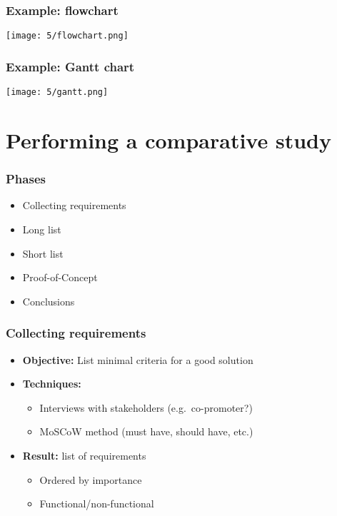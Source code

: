 \documentclass[aspectratio=169]{beamer}
\begin{document}
\begin{frame}
  \frametitle{Example: flowchart}

  \centering
  \texttt{[image: 5/flowchart.png]}
\end{frame}

\begin{frame}
  \frametitle{Example: Gantt chart}

  \centering
  \texttt{[image: 5/gantt.png]}
\end{frame}

\section{Performing a comparative study}

\begin{frame}
  \frametitle{Phases}


  \begin{itemize}
    \item Collecting requirements
    \item Long list
    \item Short list
    \item Proof-of-Concept
    \item Conclusions
  \end{itemize}

\end{frame}

\begin{frame}
  \frametitle{Collecting requirements}

  \begin{itemize}
    \item \textbf{Objective:} List minimal criteria for a good solution
    \item \textbf{Techniques:}
          \begin{itemize}
            \item Interviews with stakeholders (e.g.\ co-promoter?)
            \item MoSCoW method (must have, should have, etc.)
          \end{itemize}
    \item \textbf{Result:} list of requirements
          \begin{itemize}
            \item Ordered by importance
            \item Functional/non-functional
          \end{itemize}
  \end{itemize}

\end{frame}
\end{document}

